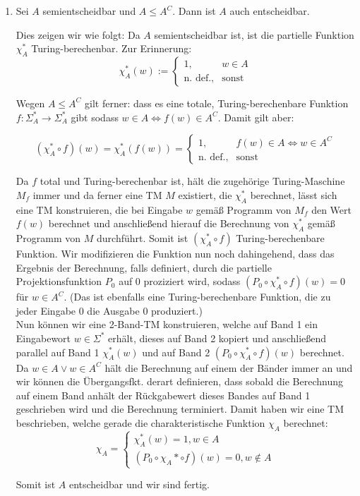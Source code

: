 \documentclass{article}
\begin{document}
\begin{enumerate}
	\item Sei $A$ semientscheidbar und $A \le A^C$. Dann ist $A$ auch entscheidbar.
	
	Dies zeigen wir wie folgt: Da $A$ semientscheidbar ist, ist die partielle Funktion $\chi^*_A$ Turing-berechenbar. Zur Erinnerung:
	\begin{equation}
		\chi^*_A(w) := \begin{cases}
		1, &w \in A\\
		\text{n. def.}, &\text{sonst}
		\end{cases}
	\end{equation}
	
	Wegen $A \le A^C$ gilt ferner: dass es eine totale, Turing-berechenbare Funktion $f : \Sigma_A^* \to \Sigma_A^*$ gibt sodass $w \in A \Leftrightarrow f(w) \in A^C$. Damit gilt aber:
	
	\begin{equation}
		(\chi_A^* \circ f) (w) = \chi_A^* (f(w)) = \begin{cases}
		1, &f(w)\in A \Leftrightarrow w \in A^C\\
		\text{n. def.}, &\text{sonst}
		\end{cases}
	\end{equation}
	
	Da $f$ total und Turing-berechenbar ist, hält die zugehörige Turing-Maschine $M_f$ immer und da ferner eine TM $M$ existiert, die $\chi_A^*$ berechnet, lässt sich eine TM konstruieren, die bei Eingabe $w$ gemäß Programm von $M_f$ den Wert $f(w)$ berechnet und anschließend hierauf die Berechnung von $\chi_A^*$ gemäß Programm von $M$ durchführt. Somit ist $(\chi_A^* \circ f)$ Turing-berechenbare Funktion. Wir modifizieren die Funktion nun noch dahingehend, dass das Ergebnis der Berechnung, falls definiert, durch die partielle Projektionsfunktion $P_0$ auf 0 proziziert wird, sodass $(P_0 \circ \chi_A^* \circ f)(w) = 0$ für $w \in A^C$. (Das ist ebenfalls eine Turing-berechenbare Funktion, die zu jeder Eingabe 0 die Ausgabe 0 produziert.)\\
	
	Nun können wir eine 2-Band-TM konstruieren, welche auf Band 1 ein Eingabewort $w \in \Sigma^*$ erhält, dieses auf Band 2 kopiert und anschließend parallel auf Band 1 $\chi_A^*(w)$ und auf Band 2 $(P_0 \circ \chi_A^*\circ f)(w)$ berechnet. Da $w\in A \lor w \in A^C$ hält die Berechnung auf einem der Bänder immer an und wir können die Übergangsfkt. derart definieren, dass sobald die Berechnung auf einem Band anhält der Rückgabewert dieses Bandes auf Band 1 geschrieben wird und die Berechnung terminiert. Damit haben wir eine TM beschrieben, welche gerade die charakteristische Funktion $\chi_A$ berechnet:
	\begin{equation}
		\chi_A = \begin{cases}
		\chi_A^*(w) = 1, w \in A\\
		(P_0\circ \chi_A* \circ f) (w) = 0, w\not\in A
		\end{cases}
	\end{equation}
	
	Somit ist $A$ entscheidbar und wir sind fertig.
	
	
\end{enumerate}
\end{document}
